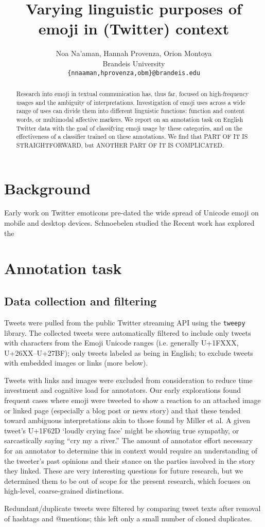 \documentclass[11pt]{article}
\title{Varying linguistic purposes of emoji in (Twitter) context}
\author{Noa Na'aman, Hannah Provenza, Orion Montoya\\
  Brandeis University \\
  {\tt \{nnaaman,hprovenza,obm\}@brandeis.edu}\\}
\date{}
\begin{document}
\maketitle

\begin{abstract}

Research into emoji in textual communication has, thus far, focused on high-frequency usages and
the ambiguity of interpretations. Investigation of emoji uses across a wide range of uses can divide them
into different linguistic functions: function and content words, or multimodal affective markers. We report on an
annotation task on English Twitter data with the goal of classifying emoji usage by these categories, and on the
effectiveness of a classifier trained on these annotations. We find that 
PART OF IT IS STRAIGHTFORWARD, 
but
ANOTHER PART OF IT IS COMPLICATED.

\end{abstract}

\section{Background}

Early work on Twitter emoticons \cite{tylerEmoticons2012} pre-dated the wide spread of Unicode emoji on mobile and desktop devices. Schnoebelen studied the 
Recent work \cite{MillerEmoji2016} has explored the 



\section{Annotation task}

\subsection{Data collection and filtering}
Tweets were pulled from the public Twitter streaming API using the \texttt{tweepy} library. The collected tweets were automatically filtered to include only tweets with characters from the Emoji Unicode ranges (i.e. generally U+1FXXX, U+26XX--U+27BF); only tweets labeled as being in English; to exclude tweets with embedded images or links (more below).

Tweets with links and images were excluded from consideration to reduce time investment and cognitive load for annotators. Our early explorations found frequent cases where emoji were tweeted to show a reaction to an attached image or linked page (especially a blog post or news story) and that these tended toward ambiguous interpretations akin to those found by Miller et al. A given tweet's U+1F62D `loudly crying face' might be showing true sympathy, or sarcastically saying ``cry my a river.'' The amount of annotator effort necessary for an annotator to determine this in context would require an understanding of the tweeter's past opinions and their stance on the parties involved in the story they linked. These are very interesting questions for future research, but we determined them to be out of scope for the present research, which focuses on high-level, coarse-grained distinctions.

Redundant/duplicate tweets were filtered by comparing tweet texts after removal of hashtags and @mentions; this left only a small number of cloned duplicates.



\end{document}
